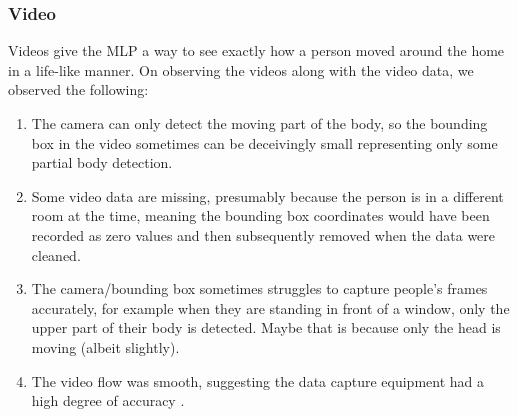 \documentclass[fleqn,10pt]{SelfArx} %
\begin{document}
\subsubsection{Video}
Videos give the MLP a way to see exactly how a person moved around the home in a life-like manner. On observing the videos along with the video data, we observed the following:
\begin{enumerate}
\item The camera can only detect the moving part of the body, so the bounding box in the video sometimes can be deceivingly small representing only some partial body detection.
\item Some video data are missing, presumably because the person is in a different room at the time, meaning the bounding box coordinates would have been recorded as zero values and then subsequently removed when the data were cleaned.
\item The camera/bounding box sometimes struggles to capture people’s frames accurately, for example when they are standing in front of a window, only the upper part of their body is detected. Maybe that is because only the head is moving (albeit slightly).
\item The video flow was smooth, suggesting the data capture equipment had a high degree of  accuracy .
\end{enumerate}
\end{document}
